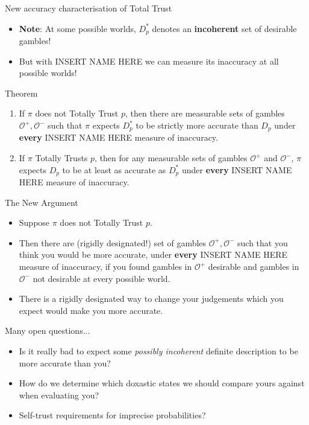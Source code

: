 \documentclass[aspectratio=169, dvipsnames]{beamer}
\newcommand{\Oset}{\mathcal{O}}
\begin{document}
\begin{frame}{New accuracy characterisation of Total Trust}
  \begin{itemize}
  \item \textbf{Note}: At some possible worlds, $D_p^*$ denotes an \alert{\textbf{incoherent}} set of desirable gambles!
  \item But with INSERT NAME HERE we can measure its inaccuracy at all possible worlds!
  \end{itemize}
  \begin{block}{Theorem}
    \begin{enumerate}
      \item If $\pi$ does not Totally Trust $p$, then there are measurable sets of gambles $\Oset^+, \Oset^-$ such that
        $\pi$ expects $D_p^*$ to be strictly more accurate than $D_p$ under \alert{\textbf{every}}
        INSERT NAME HERE measure of inaccuracy.
      \item If $\pi$ Totally Trusts $p$, then for any measurable sets of gambles $\Oset^+$ and $\Oset^-$, $\pi$ expects $D_p$
        to be at least as accurate as $D_p^*$ under \alert{\textbf{every}} INSERT NAME HERE measure of inaccuracy.
    \end{enumerate}
  \end{block}
\end{frame}

\begin{frame}{The New Argument}
  \begin{itemize}
  \item Suppose $\pi$ does not Totally Trust $p$.
  \item Then there are (rigidly designated!) set of gambles $\Oset^+, \Oset^-$ such that you think you would be more accurate,
    under \textbf{\alert{every}} INSERT NAME HERE measure of inaccuracy, if you found gambles in $\Oset^+$ desirable and
    gambles in $\Oset^-$ not desirable at every possible world.
  \item There is a rigidly designated way to change your judgements which you expect would make you more accurate.
  \end{itemize}
\end{frame}

\begin{frame}{Many open questions...}
  \begin{itemize}
  \item Is it really bad to expect some \textit{possibly incoherent} definite description to be more accurate than you? 
  \item How do we determine which doxastic states we should compare yours against when evaluating you?
  \item Self-trust requirements for imprecise probabilities?
  \end{itemize}
  
\end{frame}
\end{document}
